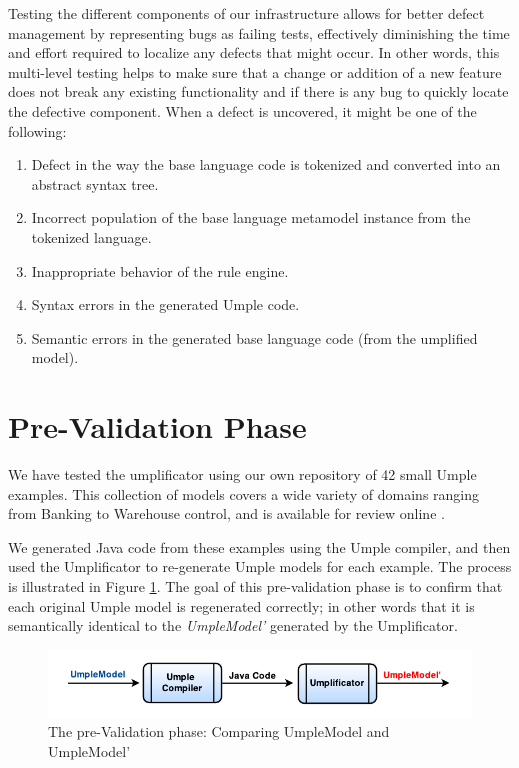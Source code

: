 Testing the different components of our infrastructure allows for better defect management by representing bugs as failing tests, effectively diminishing the time and effort required to localize any defects that might occur. In other words, this multi-level testing helps to make sure that a change or addition of a new feature does not break any existing functionality and if there is any bug to quickly locate the defective component. When a defect is uncovered, it might be one of the following:

\begin{enumerate}
\item Defect in the way the base language code is tokenized and converted into an abstract syntax tree.

\item Incorrect population of the base language metamodel instance from the tokenized language.

\item Inappropriate behavior of the rule engine.

\item Syntax errors in the generated Umple code.

\item Semantic errors in the generated base language code (from the umplified model).
\end{enumerate}

\section{Pre-Validation Phase}

We have tested the umplificator using our own repository of 42 small Umple examples. This collection of models covers a wide variety of domains ranging from Banking to Warehouse control, and is available for review online \cite{umpleexamples}.

We generated Java code from these examples using the Umple compiler, and then used the Umplificator to re-generate Umple models for each example. The process is illustrated in Figure \ref{fig:preValidation}. The goal of this pre-validation phase is to confirm that each original Umple model is regenerated correctly; in other words that it is semantically identical to the \textit{UmpleModel'}  generated by the Umplificator.
 
\begin{figure}[h]
\centering
\includegraphics{Figures/preValidation.pdf} 
\caption{The pre-Validation phase: Comparing UmpleModel and UmpleModel'}
\label{fig:preValidation}
\end{figure}

